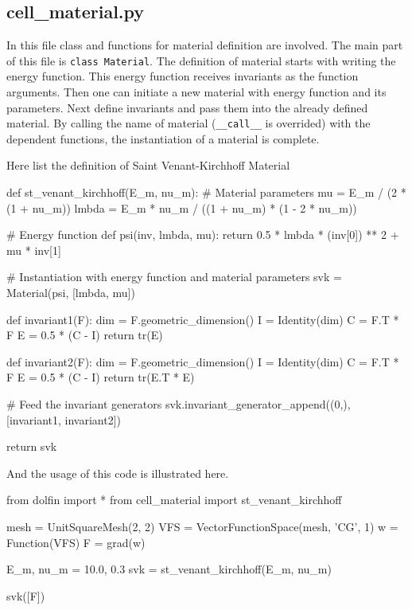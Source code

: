 \documentclass[10pt,a4paper]{scrreprt}
\begin{document}
\subsection{cell\_material.py}
In this file class and functions for material definition are involved. The main part of this file is \texttt{class Material}. The definition of material starts with writing the energy function. This energy function receives invariants as the function arguments. Then one can initiate a new material with energy function and its parameters. Next define invariants and pass them into the already defined material. By calling the name of material (\texttt{\_\_call\_\_} is overrided) with the dependent functions, the instantiation of a material is complete.

Here list the definition of Saint Venant-Kirchhoff Material

\begin{python}
def st_venant_kirchhoff(E_m, nu_m):
	# Material parameters
    mu = E_m / (2 * (1 + nu_m))
    lmbda = E_m * nu_m / ((1 + nu_m) * (1 - 2 * nu_m))

	# Energy function
    def psi(inv, lmbda, mu):
        return 0.5 * lmbda * (inv[0]) ** 2 + mu * inv[1]

	# Instantiation with energy function and material parameters
    svk = Material(psi, [lmbda, mu])

    def invariant1(F):
        dim = F.geometric_dimension()
        I = Identity(dim)
        C = F.T * F
        E = 0.5 * (C - I)
        return tr(E)

    def invariant2(F):
        dim = F.geometric_dimension()
        I = Identity(dim)
        C = F.T * F
        E = 0.5 * (C - I)
        return tr(E.T * E)
	
	# Feed the invariant generators
    svk.invariant_generator_append((0,), [invariant1, invariant2])

    return svk
\end{python}

And the usage of this code is illustrated here.
\begin{python}
from dolfin import *
from cell_material import st_venant_kirchhoff

mesh = UnitSquareMesh(2, 2)
VFS = VectorFunctionSpace(mesh, 'CG', 1)
w = Function(VFS)
F = grad(w)

E_m, nu_m = 10.0, 0.3
svk = st_venant_kirchhoff(E_m, nu_m)

svk([F])
\end{python}
\end{document}
